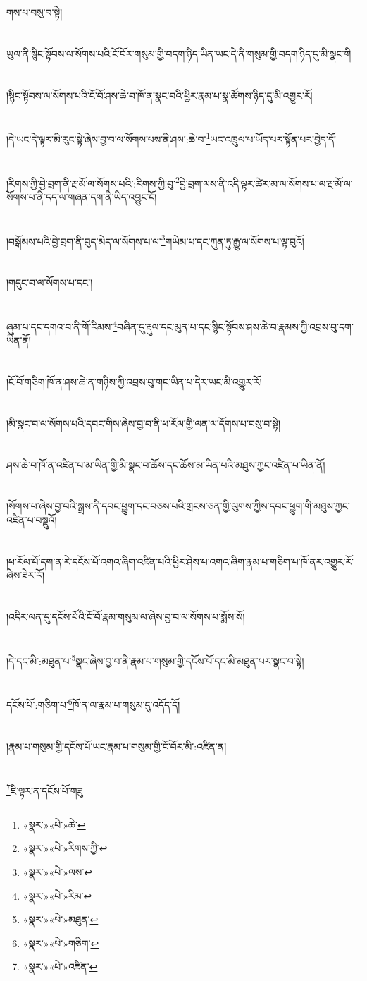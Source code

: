 གས་པ་བསུ་བ་སྟེ།\chapter{ }ཡུལ་ནི་སྙིང་སྟོབས་ལ་སོགས་པའི་ངོ་བོར་གསུམ་གྱི་བདག་ཉིད་ཡིན་ཡང་དེ་ནི་གསུམ་གྱི་བདག་ཉིད་དུ་མི་སྣང་གི\chapter{ }།སྙིང་སྟོབས་ལ་སོགས་པའི་ངོ་བོ་ཤས་ཆེ་བ་ཁོ་ན་སྣང་བའི་ཕྱིར་རྣམ་པ་སྣ་ཚོགས་ཉིད་དུ་མི་འགྱུར་རོ།\chapter{ }།དེ་ཡང་དེ་ལྟར་མི་རུང་སྟེ་ཞེས་བྱ་བ་ལ་སོགས་པས་ནི་ཤས་:ཆེ་བ་\footnote{«སྣར་»«པེ་»ཆེ་}ཡང་འཁྲུལ་པ་ཡོད་པར་སྟོན་པར་བྱེད་དོ།\chapter{ }།རིགས་ཀྱི་བྱེ་བྲག་ནི་རྔ་མོ་ལ་སོགས་པའི་:རིགས་ཀྱི་བུ་\footnote{«སྣར་»«པེ་»རིགས་ཀྱི་}བྱེ་བྲག་ལས་ནི་འདི་ལྟར་ཚེར་མ་ལ་སོགས་པ་ལ་རྔ་མོ་ལ་སོགས་པ་ནི་དད་ལ་གཞན་དག་ནི་ཡིད་འབྱུང་ངོ།\chapter{ }།བསྒོམས་པའི་བྱེ་བྲག་ནི་བུད་མེད་ལ་སོགས་པ་ལ་\footnote{«སྣར་»«པེ་»ལས་}གཡེམ་པ་དང་ཀུན་ཏུ་རྒྱུ་ལ་སོགས་པ་ལྟ་བུའོ།\chapter{ }།གདུང་བ་ལ་སོགས་པ་དང་།\chapter{ }ཞུམ་པ་དང་དགའ་བ་ནི་གོ་རིམས་\footnote{«སྣར་»«པེ་»རིམ་}བཞིན་དུ་རྡུལ་དང་མུན་པ་དང་སྙིང་སྟོབས་ཤས་ཆེ་བ་རྣམས་ཀྱི་འབྲས་བུ་དག་ཡིན་ནོ།\chapter{ }།ངོ་བོ་གཅིག་ཁོ་ན་ཤས་ཆེ་ན་གཉིས་ཀྱི་འབྲས་བུ་གང་ཡིན་པ་དེར་ཡང་མི་འགྱུར་རོ།\chapter{ }།མི་སྣང་བ་ལ་སོགས་པའི་དབང་གིས་ཞེས་བྱ་བ་ནི་ཕ་རོལ་གྱི་ལན་ལ་དོགས་པ་བསུ་བ་སྟེ།\chapter{ }ཤས་ཆེ་བ་ཁོ་ན་འཛིན་པ་མ་ཡིན་གྱི་མི་སྣང་བ་ཆོས་དང་ཆོས་མ་ཡིན་པའི་མཐུས་ཀྱང་འཛིན་པ་ཡིན་ནོ།\chapter{ }།སོགས་པ་ཞེས་བྱ་བའི་སྒྲས་ནི་དབང་ཕྱུག་དང་བཅས་པའི་གྲངས་ཅན་གྱི་ལུགས་ཀྱིས་དབང་ཕྱུག་གི་མཐུས་ཀྱང་འཛིན་པ་བསྡུའོ།\chapter{ }།ཕ་རོལ་པོ་དག་ན་རེ་དངོས་པོ་འགའ་ཞིག་འཛིན་པའི་ཕྱིར་ཤེས་པ་འགའ་ཞིག་རྣམ་པ་གཅིག་པ་ཁོ་ནར་འགྱུར་རོ་ཞེས་ཟེར་རོ།\chapter{ }།འདིར་ལན་དུ་དངོས་པོའི་ངོ་བོ་རྣམ་གསུམ་ལ་ཞེས་བྱ་བ་ལ་སོགས་པ་སྨོས་སོ།\chapter{ }།དེ་དང་མི་:མཐུན་པ་\footnote{«སྣར་»«པེ་»མཐུན་}སྣང་ཞེས་བྱ་བ་ནི་རྣམ་པ་གསུམ་གྱི་དངོས་པོ་དང་མི་མཐུན་པར་སྣང་བ་སྟེ།\chapter{ }དངོས་པོ་:གཅིག་པ་\footnote{«སྣར་»«པེ་»གཅིག་}ཁོ་ན་ལ་རྣམ་པ་གསུམ་དུ་འདོད་དོ།\chapter{ }།རྣམ་པ་གསུམ་གྱི་དངོས་པོ་ཡང་རྣམ་པ་གསུམ་གྱི་ངོ་བོར་མི་:འཛིན་ན།\chapter{ }\footnote{«སྣར་»«པེ་»འཛིན་}ཇི་ལྟར་ན་དངོས་པོ་གཟུ